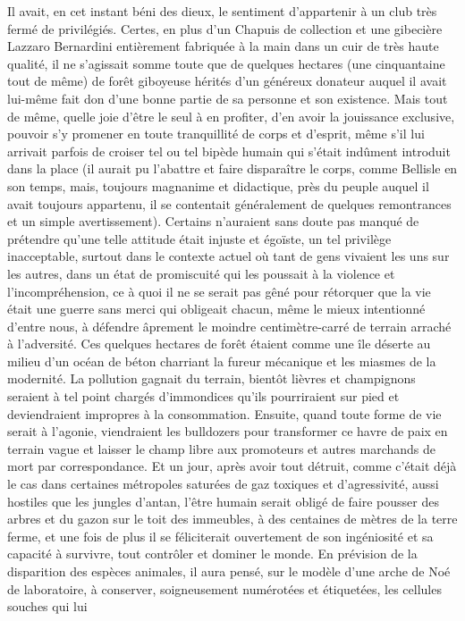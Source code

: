 Il avait, en cet instant béni des dieux, le sentiment d’appartenir à un club très fermé de privilégiés. Certes, en plus d’un Chapuis de collection et une gibecière Lazzaro Bernardini entièrement fabriquée à la main dans un cuir de très haute qualité, il ne s’agissait somme toute que de quelques hectares (une cinquantaine tout de même) de forêt giboyeuse hérités d’un généreux donateur auquel il avait lui-même fait don d’une bonne partie de sa personne et son existence. Mais tout de même, quelle joie d’être le seul à en profiter, d’en avoir la jouissance exclusive, pouvoir s’y promener en toute tranquillité de corps et d’esprit, même s’il lui arrivait parfois de croiser tel ou tel bipède humain qui s’était indûment introduit dans la place (il aurait pu l’abattre et faire disparaître le corps, comme Bellisle en son temps, mais, toujours magnanime et didactique, près du peuple auquel il avait toujours appartenu, il se contentait généralement de quelques remontrances et un simple avertissement). Certains n’auraient sans doute pas manqué de prétendre qu’une telle attitude était injuste et égoïste, un tel privilège inacceptable, surtout dans le contexte actuel où tant de gens vivaient les uns sur les autres, dans un état de promiscuité qui les poussait à la violence et l’incompréhension, ce à quoi il ne se serait pas gêné pour rétorquer que la vie était une guerre sans merci qui obligeait chacun, même le mieux intentionné d’entre nous, à défendre âprement le moindre centimètre-carré de terrain arraché à l’adversité. Ces quelques hectares de forêt étaient comme une île déserte au milieu d’un océan de béton charriant la fureur mécanique et les miasmes de la modernité. La pollution gagnait du terrain, bientôt lièvres et champignons seraient à tel point chargés d’immondices qu’ils pourriraient sur pied et deviendraient impropres à la consommation. Ensuite, quand toute forme de vie serait à l’agonie, viendraient les bulldozers pour transformer ce havre de paix en terrain vague et laisser le champ libre aux promoteurs et autres marchands de mort par correspondance. Et un jour, après avoir tout détruit, comme c’était déjà le cas dans certaines métropoles saturées de gaz toxiques et d’agressivité, aussi hostiles que les jungles d’antan, l’être humain serait obligé de faire pousser des arbres et du gazon sur le toit des immeubles, à des centaines de mètres de la terre ferme, et une fois de plus il se féliciterait ouvertement de son ingéniosité et sa capacité à survivre, tout contrôler et dominer le monde. En prévision de la disparition des espèces animales, il aura pensé, sur le modèle d’une arche de Noé de laboratoire, à conserver, soigneusement numérotées et étiquetées, les cellules souches qui lui %

